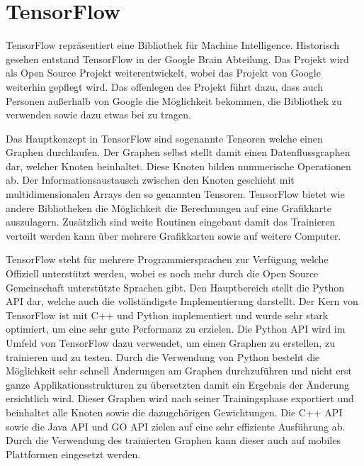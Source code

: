 \chapter{TensorFlow}
\label{cha:TensorFlow}

TensorFlow repräsentiert eine Bibliothek für Machine Intelligence. 
Historisch gesehen entstand TensorFlow in der Google Brain Abteilung.
Das Projekt wird als Open Source Projekt weiterentwickelt, wobei das Projekt von Google weiterhin gepflegt wird. 
Das offenlegen des Projekt führt dazu, dass auch Personen außerhalb von Google die Möglichkeit bekommen, die Bibliothek zu verwenden sowie dazu etwas bei zu tragen. \newline

\noindent
Das Hauptkonzept in TensorFlow sind sogenannte Tensoren welche einen Graphen durchlaufen. 
Der Graphen selbst stellt damit einen Datenflussgraphen dar, welcher Knoten beinhaltet. 
Diese Knoten bilden nummerische Operationen ab.
Der Informationsaustausch zwischen den Knoten geschieht mit multidimensionalen Arrays den so genannten Tensoren.
TensorFlow bietet wie andere Bibliotheken die Möglichkeit die Berechnungen auf eine Grafikkarte auszulagern.
Zusätzlich sind weite Routinen eingebaut damit das Trainieren verteilt werden kann über mehrere Grafikkarten sowie auf weitere Computer. \newline

\noindent
TensorFlow steht für mehrere Programmiersprachen zur Verfügung welche Offiziell unterstützt werden, wobei es noch mehr durch die Open Source Gemeinschaft unterstützte Sprachen gibt.
Den Hauptbereich stellt die Python API dar, welche auch die vollständigste Implementierung darstellt. 
Der Kern von TensorFlow ist mit C++ und Python implementiert und wurde sehr stark optimiert, um eine sehr gute Performanz zu erzielen.
Die Python API wird im Umfeld von TensorFlow dazu verwendet, um einen Graphen zu erstellen, zu trainieren und zu testen. 
Durch die Verwendung von Python besteht die Möglichkeit sehr schnell Änderungen am Graphen durchzuführen und nicht erst ganze Applikationsstrukturen zu übersetzten damit ein Ergebnis der Änderung ersichtlich wird. 
Dieser Graphen wird nach seiner Trainingsphase exportiert und beinhaltet alle Knoten sowie die dazugehörigen Gewichtungen. 
Die C++ API sowie die Java API und GO API zielen auf eine sehr effiziente Ausführung ab.
Durch die Verwendung des trainierten Graphen kann dieser auch auf mobiles Plattformen eingesetzt werden.

